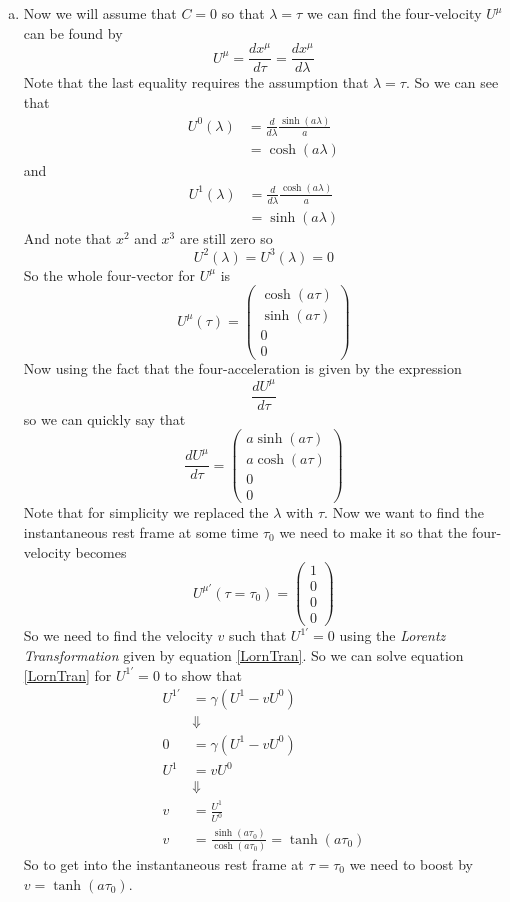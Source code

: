 \documentclass[11pt]{article}
\numberwithin{equation}{section}
\begin{document}
\begin{enumerate}[(a)]
\item
Now we will assume that $C=0$ so that $\lambda = \tau$ we can find the four-velocity $U^{\mu}$ can be found by
$$U^{\mu} = \frac{dx^{\mu}}{d\tau}  = \frac{dx^{\mu}}{d\lambda}$$
Note that the last equality requires the assumption that $\lambda = \tau$. So we can see that 
\begin{align*}
U^0(\lambda) &= \frac{d}{d\lambda}\frac{\sinh(a\lambda)}{a}\\
&= \cosh(a\lambda)
\end{align*}
and
\begin{align*}
U^1(\lambda) &= \frac{d}{d\lambda}\frac{\cosh(a\lambda)}{a}\\
&= \sinh(a\lambda)
\end{align*}
And note that $x^2$ and $x^3$ are still zero so
$$U^2(\lambda) = U^3(\lambda) = 0$$
So the whole four-vector for $U^{\mu}$ is 
$$U^{\mu}(\tau) = \left(\begin{array}{c} 	\cosh(a\tau)\\
					\sinh(a\tau)\\
					0\\
					0\end{array}\right)$$
Now using the fact that the four-acceleration is given by the expression
$$\frac{dU^{\mu}}{d\tau}$$
so we can quickly say that
$$\frac{dU^{\mu}}{d\tau} = \left(\begin{array}{c} 	a\sinh(a\tau)\\
					a\cosh(a\tau)\\
					0\\
					0\end{array}\right)$$
Note that for simplicity we replaced the $\lambda$ with $\tau$. Now we want to find the instantaneous rest frame at some time $\tau_0$ we need to make it so that the four-velocity becomes 
$$U^{\mu'}(\tau = \tau_0) = \left(\begin{array}{c} 	1\\
					0\\
					0\\
					0\end{array}\right)$$
So we need to find the velocity $v$ such that $U^{1'} = 0$ using the \emph{Lorentz Transformation} given by equation \ref{LornTran}. So we can solve equation \ref{LornTran} for $U^{1'} = 0$ to show that
\begin{align*}
U^{1'} &= \gamma(U^1-vU^0)\\
&\Downarrow\\
0 &= \gamma(U^1-vU^0)\\
U^{1} &= vU^0\\
&\Downarrow\\
v &= \frac{U^1}{U^0}\\
v &= \frac{\sinh(a\tau_0)}{\cosh(a\tau_0)} = \tanh(a\tau_0)
\end{align*}
So to get into the instantaneous rest frame at $\tau=\tau_0$ we need to boost by $v = \tanh(a\tau_0)$.


\end{enumerate}
\end{document}
